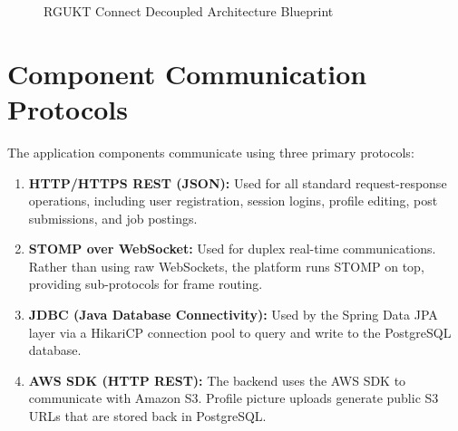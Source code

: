 \begin{figure}[H]
{
    }
    \caption{RGUKT Connect Decoupled Architecture Blueprint}
    \label{fig:system_architecture}
\end{figure}

\section{Component Communication Protocols}
The application components communicate using three primary protocols:
\begin{enumerate}
    \item \textbf{HTTP/HTTPS REST (JSON):} Used for all standard request-response operations, including user registration, session logins, profile editing, post submissions, and job postings.
    \item \textbf{STOMP over WebSocket:} Used for duplex real-time communications. Rather than using raw WebSockets, the platform runs STOMP on top, providing sub-protocols for frame routing.
    \item \textbf{JDBC (Java Database Connectivity):} Used by the Spring Data JPA layer via a HikariCP connection pool to query and write to the PostgreSQL database.
    \item \textbf{AWS SDK (HTTP REST):} The backend uses the AWS SDK to communicate with Amazon S3. Profile picture uploads generate public S3 URLs that are stored back in PostgreSQL.
\end{enumerate}
